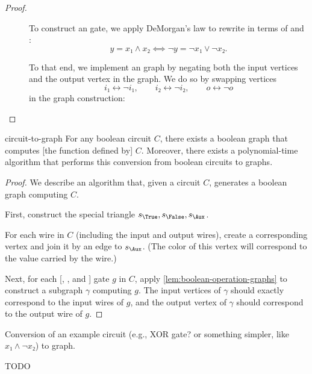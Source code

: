\begin{proof}
\begin{description}
\item[\AND] To construct an \AND{} gate, we apply DeMorgan's law to rewrite
  \AND{} in terms of \NOT{} and \OR:
  \[
    y=x₁∧x₂ ⟺ ¬y=¬x₁∨¬x₂.
  \]

  To that end, we implement an \AND{} graph by negating both the input
  vertices and the output vertex in the \OR{} graph.  We do so by swapping
  vertices
  \[
    i₁↔¬i₁, \qquad i₂↔¬i₂, \qquad o↔¬o
  \]
  in the \OR{} graph construction:

  \begin{center}
  \end{center}


\end{description}

\end{proof}

\begin{theorem}{}{circuit-to-graph}%
  For any boolean circuit \(C\), there exists a boolean graph that computes
  [the function defined by] \(C\).  Moreover, there exists a polynomial-time
  algorithm that performs this conversion from boolean circuits to graphs.
\end{theorem}

\begin{proof}
  We describe an algorithm that, given a circuit \(C\), generates a boolean
  graph computing \(C\).

  First, construct the special triangle \(s_\True,s_\False,s_\Aux\).

  For each wire in \(C\) (including the input and output wires), create a
  corresponding vertex and join it by an edge to \(s_\Aux\). (The color of this
  vertex will correspond to the value carried by the wire.)

  Next, for each [\NOT, \OR, and \AND] gate \(g\) in \(C\), apply
  \cref{lem:boolean-operation-graphs} to construct a subgraph \(γ\) computing
  \(g\).  The input vertices of \(γ\) should exactly correspond to the input
  wires of \(g\), and the output vertex of \(γ\) should correspond to the
  output wire of \(g\).


\end{proof}

\begin{example}{}{}
  Conversion of an example circuit (e.g., XOR gate?  or something simpler, like
  \(x₁∧¬x₂\)) to graph.

  TODO
\end{example}

